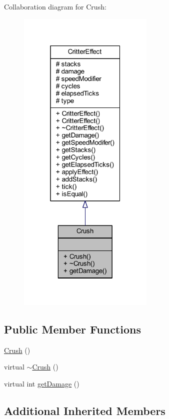 Collaboration diagram for Crush\+:
\nopagebreak
\begin{figure}[H]
\begin{center}
\leavevmode
\includegraphics[width=184pt]{struct_crush__coll__graph}
\end{center}
\end{figure}
\subsection*{Public Member Functions}
\begin{DoxyCompactItemize}
\item 
\hyperlink{struct_crush_a09bea4783bddac1b22881b1cd72c45a1}{Crush} ()
\item 
virtual \hyperlink{struct_crush_a12561d6e9c10359ed031ec6d91a40be9}{$\sim$\+Crush} ()
\item 
virtual int \hyperlink{struct_crush_a269885cd9bf52fbf5af8b0f9778e0330}{get\+Damage} ()
\end{DoxyCompactItemize}
\subsection*{Additional Inherited Members}


